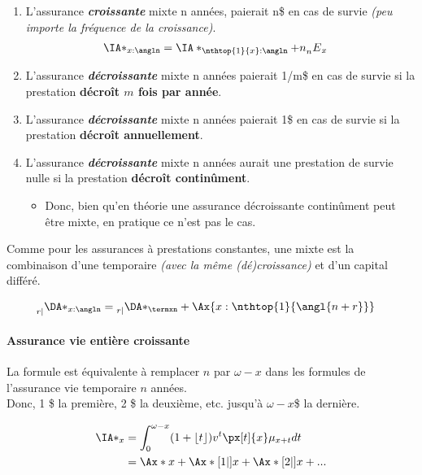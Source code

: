 \documentclass[10pt, french]{article}
\begin{document}
\begin{multicols*}{3}
\begin{enumerate}
	\item	L'assurance \textit{\textbf{croissante}} mixte n années, paierait n\$ en cas de survie \textit{(peu importe la fréquence de la croissance)}.
	\begin{align*}
		\IA*_{x:\angln} &= \IA*_{\nthtop{1}{x}:\angln}  + n {\prescript{}{n}E_{x}} 
	\end{align*}
	\item	L'assurance \textit{\textbf{décroissante}} mixte n années paierait 1/m\$ en cas de survie si la prestation \textbf{décroît $m$ fois par année}.
	\item	L'assurance \textit{\textbf{décroissante}} mixte n années paierait 1\$ en cas de survie si la prestation \textbf{décroît annuellement}.
	\item	L'assurance \textit{\textbf{décroissante}} mixte n années aurait une prestation de survie nulle si la prestation \textbf{décroît continûment}. 
		\begin{itemize}
		\item	Donc, bien qu'en théorie une assurance décroissante continûment peut être mixte, en pratique ce n'est pas le cas.
		\end{itemize}
\end{enumerate}

Comme pour les assurances à prestations constantes, une mixte est la combinaison d'une temporaire \textit{(avec la même (dé)croissance)} et d'un capital différé.

\begin{align*}
	\prescript{}{r|}{\DA*_{x:\angln}} &= \prescript{}{r|}{\DA*_{\termxn}} + \Ax{x:\nthtop{1}{\angl{n + r}}}
\end{align*}



\columnbreak
\paragraph{Assurance vie entière croissante}
\begin{definitionNOHFILLprop}
La formule est équivalente à remplacer $n$ par $\omega - x$ dans les formules de l'assurance vie temporaire $n$ années.\\ 
Donc, 1 \$ la première, 2 \$ la deuxième, etc. jusqu'à \textbf{$\omega - x$}\$ la dernière.

\begin{align*}
	\IA*_{x} &= \int_0^{\omega - x} (1 + \lfloor t \rfloor) v^t \px[t]{x} \mu_{x+t} dt \\
		&= \Ax*{x} + \Ax*[1|]{x} + \Ax*[2|]{x} + ...
\end{align*}
\end{definitionNOHFILLprop}



\end{multicols*}
\end{document}
